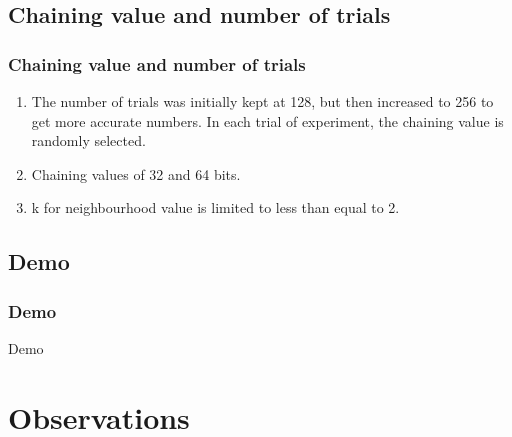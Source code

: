 \documentclass{beamer}
\begin{document}
\subsection{Chaining value and number of trials}

\begin{frame}
\frametitle{Chaining value and number of trials}
\begin{enumerate}
\item The number of trials was initially kept at 128, but then increased to 256 to get more accurate numbers.
In each trial of experiment, the chaining value is randomly selected.
\item Chaining values of 32 and 64 bits.
\item k for neighbourhood value is limited to less than equal to 2.
\end{enumerate}
\end{frame}


\subsection{Demo}
\begin{frame}
\frametitle{Demo}
Demo
\end{frame}

\section{Observations}
\end{document}
